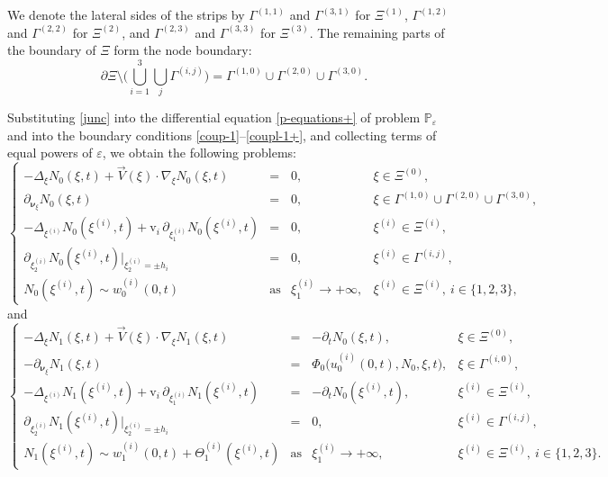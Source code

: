 \documentclass[reqno]{amsart}            %
\numberwithin{equation}{section}
\begin{document}
	We denote the lateral sides of the strips by  
	$\Gamma^{(1,1)}$ and $\Gamma^{(3,1)}$ for $\Xi^{(1)}$,
	$\Gamma^{(1,2)}$ and $\Gamma^{(2,2)}$ for $\Xi^{(2)}$, and
	$\Gamma^{(2,3)}$ and $\Gamma^{(3,3)}$ for $\Xi^{(3)}$.
	The remaining parts of the boundary of $\Xi$ form the node boundary:
	\[
	\partial\Xi\setminus\Big(\bigcup_{i=1}^3\bigcup_j\Gamma^{(i,j)}\Big)
	=\Gamma^{(1,0)}\cup\Gamma^{(2,0)}\cup\Gamma^{(3,0)}.
	\]
	
	Substituting  \eqref{junc} into the differential equation
	\eqref{p-equations+} of problem $\mathbb{P}_\varepsilon$ and into the boundary
	conditions \eqref{coup-1}–\eqref{coupl-1+}, and collecting terms of equal
	powers of $\varepsilon$, we obtain the following problems:
	\begin{equation}\label{N_0_prob}
		\left\{
		\begin{array}{rcll}
			- \Delta_\xi N_0(\xi,t) + \overrightarrow{V}(\xi)\cdot\nabla_\xi N_0(\xi,t)
			&=& 0, & \xi\in\Xi^{(0)},
			\\[2mm]
			\partial_{\boldsymbol{\nu}_\xi} N_0(\xi,t)
			&=& 0, & \xi\in\Gamma^{(1,0)}\cup\Gamma^{(2,0)}\cup\Gamma^{(3,0)},
			\\[2mm]
			- \Delta_{\xi^{(i)}} N_0(\xi^{(i)},t)
			+ \mathrm{v}_i\,\partial_{\xi^{(i)}_1}N_0(\xi^{(i)},t)
			&=& 0, & \xi^{(i)}\in\Xi^{(i)},
			\\[2mm]
			\partial_{\xi^{(i)}_2}N_0(\xi^{(i)},t)\big|_{\xi^{(i)}_2=\pm h_i}
			&=& 0, & \xi^{(i)}\in\Gamma^{(i,j)},
			\\[2mm]
			N_0(\xi^{(i)},t)\sim w^{(i)}_0(0,t)
			&\text{as}& \xi^{(i)}_1\to+\infty, & \xi^{(i)}\in\Xi^{(i)},\ i\in\{1,2,3\},
		\end{array}
		\right.
	\end{equation}
	and
	\begin{equation}\label{N_1_prob}
		\left\{
		\begin{array}{rcll}
			- \Delta_\xi N_1(\xi,t) + \overrightarrow{V}(\xi)\cdot\nabla_\xi N_1(\xi,t)
			&=& -\partial_t N_0(\xi,t), & \xi\in\Xi^{(0)},
			\\[2mm]
			- \partial_{\boldsymbol{\nu}_\xi}N_1(\xi,t)
			&=& \Phi_0\big(u^{(i)}_0(0,t),N_0,\xi,t\big), & \xi\in\Gamma^{(i,0)},
			\\[2mm]
			- \Delta_{\xi^{(i)}} N_1(\xi^{(i)},t)
			+ \mathrm{v}_i\,\partial_{\xi^{(i)}_1}N_1(\xi^{(i)},t)
			&=& -\partial_t N_0(\xi^{(i)},t), & \xi^{(i)}\in\Xi^{(i)},
			\\[2mm]
			\partial_{\xi^{(i)}_2}N_1(\xi^{(i)},t)\big|_{\xi^{(i)}_2=\pm h_i}
			&=& 0, & \xi^{(i)}\in\Gamma^{(i,j)},
			\\[2mm]
			N_1(\xi^{(i)},t)\sim w^{(i)}_1(0,t)+\Theta^{(i)}_1(\xi^{(i)},t)
			&\text{as}& \xi^{(i)}_1\to+\infty, & \xi^{(i)}\in\Xi^{(i)},\ i\in\{1,2,3\}.
		\end{array}
		\right.
	\end{equation}	
\end{document}
